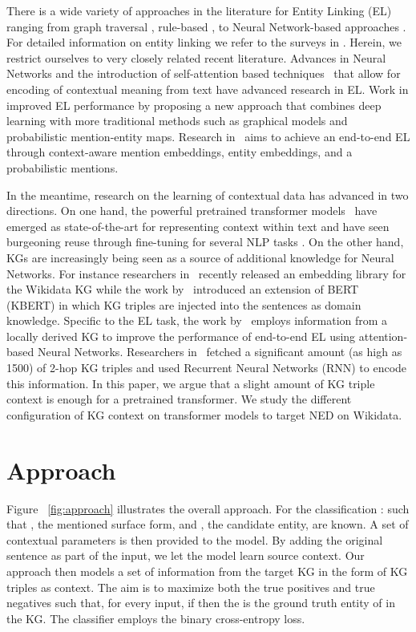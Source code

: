 \documentclass[sigconf, superscriptaddress]{acmart}
\begin{document}
There is a wide variety of approaches in the literature for Entity Linking (EL) ranging from graph traversal \cite{UsbeckNRGCAB14}, rule-based \cite{sakor2019old}, to Neural Network-based approaches \cite{kolitsas-etal-2018-end,Mulang2019ContextawareEL}.
For detailed information on entity linking we refer to the surveys in \cite{Survey-shen-et-al,Balog2018}. Herein, we restrict ourselves to very closely related recent literature. Advances in Neural Networks and the introduction of self-attention based techniques~\cite{Attention-DBLP:journals/corr/VaswaniSPUJGKP17} that allow for encoding of contextual meaning from text have advanced research in EL. Work in \cite{DBLP:conf/emnlp/GaneaH17} improved EL performance by proposing a new approach that combines deep learning with more traditional methods such as graphical models and probabilistic mention-entity maps. Research in~\cite{kolitsas-etal-2018-end} aims to achieve an end-to-end EL through context-aware mention embeddings, entity embeddings, and a probabilistic mentions.


In the meantime, research on the learning of contextual data has advanced in two directions. On one hand, the powerful pretrained transformer models~\cite{RoBERTa-DBLP:journals/corr/abs-1907-11692,XLNet-DBLP:journals/corr/abs-1906-08237} have emerged as state-of-the-art for representing context within text and have seen burgeoning reuse through fine-tuning for several NLP tasks \cite{DBLP:journals/corr/abs-2001-01447}. On the other hand, KGs are increasingly being seen as a source of additional knowledge for Neural Networks. For instance researchers in~\cite{BigGraph-DBLP:journals/corr/abs-1903-12287} recently released an embedding library for the Wikidata KG while the work by~\cite{Liu2019KBERTEL} introduced an extension of BERT (KBERT) in which KG triples are injected into the sentences as domain knowledge. Specific to the EL task, the work by~\cite{Mulang2019ContextawareEL} employs information from a locally derived KG to improve the performance of end-to-end EL using attention-based Neural Networks. Researchers in~\cite{cetoli2019neural} fetched a significant amount (as high as 1500) of 2-hop KG triples and used Recurrent Neural Networks (RNN) to encode this information. In this paper, we argue that a slight amount of KG triple context is enough for a pretrained transformer. We study the different configuration of KG context on transformer models to target NED on Wikidata.
\section{Approach} \label{sect:approach}
Figure ~\ref{fig:approach} illustrates the overall approach. For the classification :
 such that , the mentioned surface form, and , the candidate entity, are known. A set of contextual parameters  is then provided to the model. By adding the original sentence as part of the input, we let the model learn source context. Our approach then models a set of information from the target KG in the form of KG triples  as context. The aim is to maximize both the true positives and true negatives such that, for every input, if  then the  is the ground truth entity of  in the KG. The classifier employs the binary cross-entropy loss.
\end{document}
